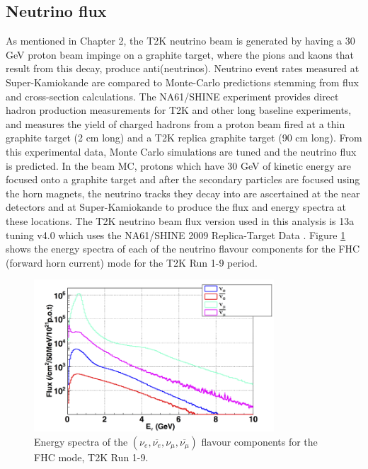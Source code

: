 \subsection{Neutrino flux}
As mentioned in Chapter 2, the T2K neutrino beam is generated by having a 30 GeV proton beam impinge on a graphite target, where the pions and kaons that result from this decay, produce anti(neutrinos). Neutrino event rates measured at Super-Kamiokande are compared to Monte-Carlo predictions stemming from flux and cross-section calculations. The NA61/SHINE experiment provides direct hadron production measurements for T2K and other long baseline experiments, and measures the yield of charged hadrons from a proton beam fired at a thin graphite target (2 cm long) and a T2K replica graphite target (90 cm long). From this experimental data, Monte Carlo simulations are tuned and the neutrino flux is predicted. In the beam MC, protons which have 30 GeV of kinetic energy are focused onto a graphite target and after the secondary particles are focused using the horn magnets, the neutrino tracks they decay into are ascertained at the near detectors and at Super-Kamiokande to produce the flux and energy spectra at these locations. The T2K neutrino beam flux version used in this analysis is 13a tuning v4.0 which uses the NA61/SHINE 2009 Replica-Target Data \cite{flux_ver}. Figure \ref{fig:energy_spectra} shows the energy spectra of each of the neutrino flavour components for the FHC (forward horn current) mode for the T2K Run 1-9 period. 
 
\begin{figure}
    \includegraphics[width=0.8\textwidth]{Figures/energy_spectra.png}
    \caption{Energy spectra of the  $\left(\nu_{e}, \overline{\nu_{e}}, \nu_{\mu}, \overline{\nu_{\mu}}\right)$ flavour components for the FHC mode, T2K Run 1-9.}
\label{fig:energy_spectra}
\end{figure}
 
